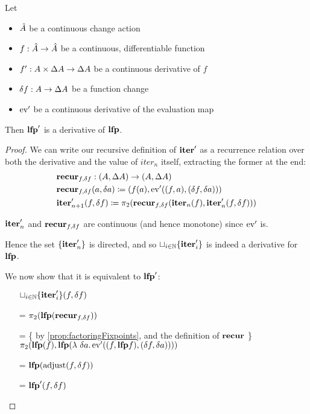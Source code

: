 \begin{thm}
  \label{thm:leastFixpointDiff}
  Let
  \begin{itemize}
    \item $\hat{A}$ be a continuous change action
    \item $f : \hat{A} \rightarrow \hat{A}$ be a continuous, differentiable function
    \item $f' : A \times \Delta A \rightarrow \Delta A$ be a continuous derivative of $f$
    \item $\delta f : A \rightarrow \Delta A$ be a function change
    \item $\operatorname{ev}'$ be a continuous derivative of the evaluation map
  \end{itemize}
  Then $\textbf{lfp}'$ is a derivative of $\textbf{lfp}$.
\end{thm}
\ifproofs
\begin{proof}
  We can write our recursive definition of $\textbf{iter}'$ as a recurrence
  relation over both the derivative and the value of $iter_n$ itself, extracting
  the former at the end:
  \begin{align*}
    &\textbf{recur}_{f, \delta f} : (A, \Delta A) \rightarrow (A, \Delta A)\\
    &\textbf{recur}_{f, \delta f} (a, \delta a) \coloneqq (f(a), \operatorname{ev}'((f, a), (\delta f, \delta a)))\\
    &\textbf{iter}_{n+1}'(f, \delta f) \coloneqq \pi_2 (\textbf{recur}_{f, \delta f}(\textbf{iter}_n(f), \textbf{iter}'_n(f, \delta f)))
  \end{align*}

  $\textbf{iter}_n'$ and $\textbf{recur}_{f, \delta f}$ are continuous (and hence monotone) since $\operatorname{ev}'$ is.

  Hence the set $\{ \textbf{iter}'_n \}$ is directed, and so $\sqcup_{i \in \mathbb{N}}
  \{ \textbf{iter}_i' \}$ is indeed a derivative for $\textbf{lfp}$.

  We now show that it is equivalent to $\textbf{lfp}'$:
  \begin{itemize}
    \item[ ]
      $\sqcup_{i \in \mathbb{N}} \{ \textbf{iter}_i' \}(f, \delta f)$
    \item[=]
      $\pi_2 (\textbf{lfp}(\textbf{recur}_{f, \delta f}))$
    \item[=]\{ by \cref{prop:factoringFixpoints}, and the definition of $\textbf{recur}$ \}\\
      $\pi_2 (\textbf{lfp}(f), \textbf{lfp} (\lambda\ \delta a. \operatorname{ev}'((f, \textbf{lfp} f), (\delta f, \delta a))))$
    \item[=]
      $\textbf{lfp}(\operatorname{adjust}(f, \delta f))$
    \item[=]
      $\textbf{lfp}'(f, \delta f)$
  \end{itemize}
\end{proof}
\fi

